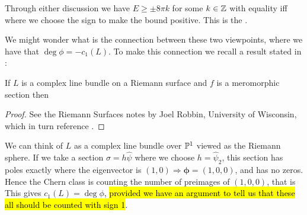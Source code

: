 \documentclass{article}
\begin{document}
Through either discussion we have $E\geq \pm 8\pi k$ for some $k \in \mathbb{Z}$ with equality iff 
where we choose the sign to make the bound positive. This is the .
\begin{remark}
	We might wonder what is the connection between these two viewpoints, where we have that $\deg \phi = -c_1(L)$. To make this connection we recall a result stated in \cite{Babelon2003}:
	\begin{prop}
		If $L$ is a complex line bundle on a Riemann surface and $f$ is a meromorphic section then 
	\end{prop}
\begin{proof}
	See the Riemann Surfaces notes by Joel Robbin, University of Wisconsin, which in turn reference \cite{Griffiths2014}. 
\end{proof}
We can think of $L$ as a complex line bundle over $\mathbb{P}^1$ viewed as the Riemann sphere. If we take a section $\sigma = h \hat{\psi}$ where we choose $h=\hat{\psi}_2$, this section has poles exactly where the eigenvector is $(1,0) \Rightarrow \bm{\phi} = (1,0,0)$, and has no zeros. Hence the Chern class is counting the number of preimages of $(1,0,0)$, that is 
This gives $c_1(L)=\deg \phi$, \hl{provided we have an argument to tell us that these all should be counted with sign 1}. 
\end{remark}
\end{document}
